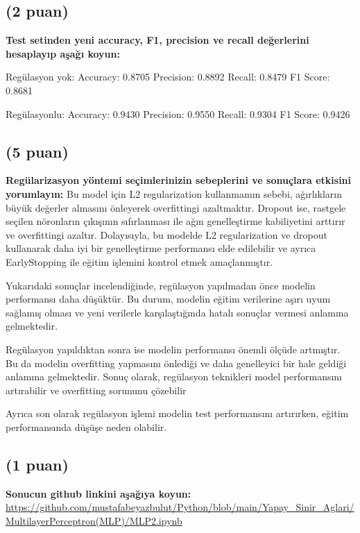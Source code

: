 \documentclass[11pt]{article}
\begin{document}
\subsection{(2 puan)} \textbf{Test setinden yeni accuracy, F1, precision ve recall değerlerini hesaplayıp aşağı koyun:}

\begin{flushleft}
Regülasyon yok: \quad Accuracy: 0.8705 \quad Precision: 0.8892 \quad Recall: 0.8479 \quad F1 Score: 0.8681 \

Regülasyonlu: \quad Accuracy:  0.9430 \quad Precision: 0.9550 \quad Recall: 0.9304 \quad F1 Score: 0.9426
\end{flushleft}
\vspace{.4in}
\subsection{(5 puan)} \textbf{Regülarizasyon yöntemi seçimlerinizin sebeplerini ve sonuçlara etkisini yorumlayın:}
\vspace{.2in}
Bu model için L2 regularization kullanmamın sebebi, ağırlıkların büyük değerler almasını önleyerek overfittingi azaltmaktır. Dropout ise, rastgele seçilen nöronların çıkışının sıfırlanması ile ağın genelleştirme kabiliyetini arttırır ve overfittingi azaltır. Dolayısıyla, bu modelde L2 regularization ve dropout kullanarak daha iyi bir genelleştirme performansı elde edilebilir ve ayrıca EarlyStopping ile eğitim işlemini kontrol etmek amaçlanmıştır.

Yukarıdaki sonuçlar incelendiğinde, regülasyon yapılmadan önce modelin performansı daha düşüktür. Bu durum, modelin eğitim verilerine aşırı uyum sağlamış olması ve yeni verilerle karşılaştığında hatalı sonuçlar vermesi anlamına gelmektedir. 

Regülasyon yapıldıktan sonra ise modelin performansı önemli ölçüde artmıştır. Bu da modelin overfitting yapmasını önlediği ve daha genelleyici bir hale geldiği anlamına gelmektedir. Sonuç olarak, regülasyon teknikleri model performansını artırabilir ve overfitting sorununu çözebilir

Ayrıca son olarak regülasyon işlemi modelin test performansını artırırken, eğitim performansında düşüşe neden olabilir.
\vspace{.4in}
\subsection{(1 puan)} \textbf{Sonucun github linkini  aşağıya koyun:}
\vspace{.2in}
\url{https://github.com/mustafabeyazbulut/Python/blob/main/Yapay_Sinir_Aglari/MultilayerPerceptron(MLP)/MLP2.ipynb}
\end{document}
